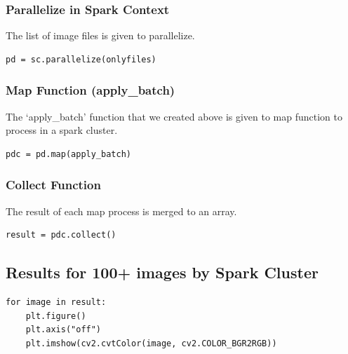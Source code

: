 \subsubsection{Parallelize in Spark
Context}\label{parallelize-in-spark-context}

The list of image files is given to parallelize.

\begin{verbatim}
pd = sc.parallelize(onlyfiles)
\end{verbatim}

\subsubsection{Map Function
(apply\_batch)}\label{map-function-apply_batch}

The `apply\_batch' function that we created above is given to map
function to process in a spark cluster.

\begin{verbatim}
pdc = pd.map(apply_batch)
\end{verbatim}

\subsubsection{Collect Function}\label{collect-function}

The result of each map process is merged to an array.

\begin{verbatim}
result = pdc.collect()
\end{verbatim}

\subsection{Results for 100+ images by Spark
Cluster}\label{results-for-100-images-by-spark-cluster}

\begin{verbatim}
for image in result:
    plt.figure()
    plt.axis("off")
    plt.imshow(cv2.cvtColor(image, cv2.COLOR_BGR2RGB))
\end{verbatim}
